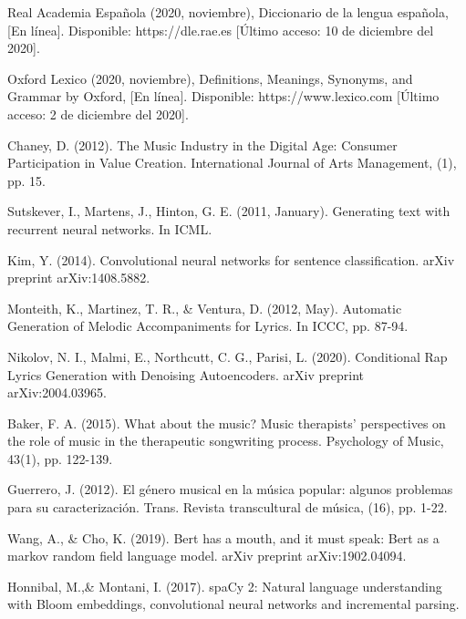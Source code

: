 \documentclass[12pt, a4paper, titlepage]{report}
\begin{document}
    \begin{thebibliography}{20}
		Real Academia Española (2020, noviembre), Diccionario de la lengua española, [En línea]. Disponible: https://dle.rae.es [Último acceso: 10 de diciembre del 2020].

		Oxford Lexico (2020, noviembre), Definitions, Meanings, Synonyms, and Grammar by Oxford, [En línea]. Disponible: https://www.lexico.com [Último acceso: 2 de diciembre del 2020].
		
		Chaney, D. (2012). The Music Industry in the Digital Age: Consumer Participation in Value Creation. International Journal of Arts Management, (1), pp. 15.
		
		Sutskever, I., Martens, J., Hinton, G. E. (2011, January). Generating text with recurrent neural networks. In ICML.
		
		Kim, Y. (2014). Convolutional neural networks for sentence classification. arXiv preprint arXiv:1408.5882.
		
		Monteith, K., Martinez, T. R., \& Ventura, D. (2012, May). Automatic Generation of Melodic Accompaniments for Lyrics. In ICCC, pp. 87-94.
		
		Nikolov, N. I., Malmi, E., Northcutt, C. G., Parisi, L. (2020). Conditional Rap Lyrics Generation with Denoising Autoencoders. arXiv preprint arXiv:2004.03965.
		
		Baker, F. A. (2015). What about the music? Music therapists’ perspectives on the role of music in the therapeutic songwriting process. Psychology of Music, 43(1), pp. 122-139.
		
		Guerrero, J. (2012). El género musical en la música popular: algunos problemas para su caracterización. Trans. Revista transcultural de música, (16), pp. 1-22.
		
		Wang, A., \& Cho, K. (2019). Bert has a mouth, and it must speak: Bert as a markov random field language model. arXiv preprint arXiv:1902.04094.
		
		Honnibal, M.,\& Montani, I. (2017). spaCy 2: Natural language understanding with Bloom embeddings, convolutional neural networks and incremental parsing.


\end{thebibliography}
\end{document}
